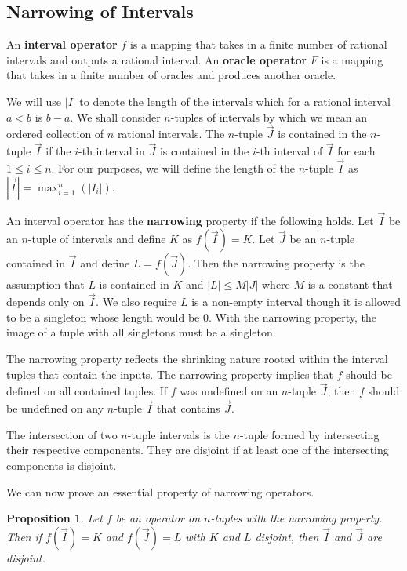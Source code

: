\documentclass[12pt]{article}
\newtheorem{proposition}{Proposition}
\theoremstyle{remark}
\begin{document}
\subsection{Narrowing of Intervals}

An \textbf{interval operator} $f$ is a mapping that takes in a finite number of rational intervals and outputs a rational interval. An \textbf{oracle operator} $F$ is a mapping that takes in a finite number of oracles and produces another oracle.

We will use $|I|$ to denote the length of the intervals which for a rational interval $a<b$ is $b-a$. We shall consider $n$-tuples of intervals by which we mean an ordered collection of $n$ rational intervals. The $n$-tuple $\vec{J}$ is contained in the $n$-tuple $\vec{I}$ if the $i$-th interval in $\vec{J}$ is contained in the $i$-th interval of $\vec{I}$ for each $1 \leq i \leq n$. For our purposes, we will define the length of the $n$-tuple $\vec{I}$ as $|\vec{I}| = \max_{i=1}^n (|I_i|)$.

An interval operator has the \textbf{narrowing} property if the following holds. Let $\vec{I}$ be an $n$-tuple of intervals and define $K$ as $f(\vec{I}) = K$. Let $\vec{J}$ be an $n$-tuple contained in $\vec{I}$ and define $L= f(\vec{J})$. Then the narrowing property is the assumption that $L$ is contained in $K$ and $|L| \leq M |J|$ where $M$ is a constant that depends only on $\vec{I}$. We also require $L$ is a non-empty interval though it is allowed to be a singleton whose length would be 0. With the narrowing property, the image of a tuple with all singletons must be a singleton. 

The narrowing property reflects the shrinking nature rooted within the interval tuples that contain the inputs. The narrowing property implies that $f$ should be defined on all contained tuples. If $f$ was undefined on an $n$-tuple $\vec{J}$, then $f$ should be undefined on any $n$-tuple $\vec{I}$ that contains $\vec{J}$. 



The intersection of two $n$-tuple intervals is the $n$-tuple formed by intersecting their respective components. They are disjoint if at least one of the intersecting components is disjoint. 

We can now prove an essential property of narrowing operators. 

\begin{proposition} \label{pr:op-nrw}
Let $f$ be an operator on $n$-tuples with the narrowing property. Then if $f(\vec{I})=K$ and $f(\vec{J}) = L$ with $K$ and $L$ disjoint, then $\vec{I}$ and $\vec{J}$ are disjoint.
\end{proposition}
\end{document}

